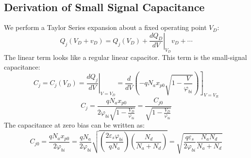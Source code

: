 \subsection{Derivation of Small Signal Capacitance}
We perform a Taylor Series expansion about a fixed operating point $V_D$:
\begin{equation} 
	{Q_j}({V_D} + {v_D}) = {Q_j}({V_D}) + {\left. {\frac{{d{Q_D}}}{{dV}}} \right|_{{V_D}}}{v_D} +  \cdots 
\end{equation}
The linear term looks like a regular linear capacitor.  This term is the small-signal capacitance:
\begin{equation} 
	C_j^{} = {C_j}({V_D}) = {\left. {\frac{{dQ_j^{}}}{{dV}}} \right|_{V = {V_D}}} = {\left. {\frac{d}{{dV}}\left( { - q{N_a}{x_{p0}}\sqrt {1 - \frac{V}{{{\varphi _{bi}}}}} } \right)} \right]_{V = {V_R}}} 
\end{equation}
\begin{equation} {C_j} = \frac{{q{N_a}{x_{p0}}}}{{2{\varphi _{bi}}\sqrt {1 - \frac{{{V_D}}}{{{\varphi _{bi}}}}} }} = \frac{{C_{j0}^{}}}{{\sqrt {1 - \frac{{{V_D}}}{{{\varphi _{bi}}}}} }} 
\end{equation}
The capacitance at zero bias can be written as:
\begin{equation} 
{C_{j0}} = \frac{{q{N_a}{x_{p0}}}}{{2{\varphi _{bi}}}} = \frac{{q{N_a}}}{{2{\varphi _{bi}}}}\sqrt {\left( {\frac{{2{\varepsilon _s}{\varphi _{bi}}}}{{q{N_a}}}} \right)\left( {\frac{{{N_d}}}{{{N_a} + {N_d}}}} \right)}  = \sqrt {\frac{{q{\varepsilon _s}}}{{2{\varphi _{bi}}}}\frac{{{N_a}{N_d}}}{{{N_a} + {N_d}}}} 
\end{equation} \label{eq:cj0}
